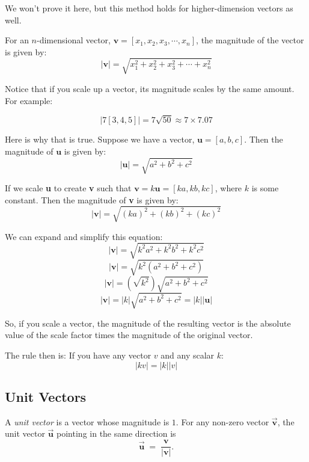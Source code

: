 We won't prove it here, but this method holds for higher-dimension vectors as well. 

\begin{mdframed}[style = important, frametitle = {Magnitude of Vectors}]
For an $n$-dimensional vector, $\textbf{v} = \left[ x_1, x_2, x_3, \cdots, x_n 
\right]$, the magnitude of the vector is given by:
$$\left| \textbf{v} \right| = \sqrt{x_1^2 + x_2^2 + x_3^2 + \cdots + x_n^2}$$
\end{mdframed}

Notice that if you scale up a vector, its magnitude scales by the same amount. 
For example:

\begin{equation*}
|7[3,4,5]| = 7 \sqrt{50} \approx 7 \times 7.07    
\end{equation*}

Here is why that is true. Suppose we have a vector, $\textbf{u} = \left[a, b, 
c \right]$. Then the magnitude of $\textbf{u}$ is given by:
$$\left| \textbf{u} \right| = \sqrt{a^2 + b^2 + c^2}$$

If we scale \textbf{u} to create \textbf{v} such that $\textbf{v} = k 
\textbf{u} = \left[ ka, kb, kc \right]$, where $k$ is some constant. Then the 
magnitude of \textbf{v} is given by:
$$\left| \textbf{v} \right| = \sqrt{\left( ka \right)^2 + \left( kb \right)^2 
+ \left( kc \right)^2}$$

We can expand and simplify this equation:
$$\left| \textbf{v} \right| = \sqrt{k^2 a^2 + k^2 b^2 + k^2 c^2}$$
$$\left| \textbf{v} \right| = \sqrt{k^2 \left( a^2 + b^2 + c^2 \right)}$$
$$\left| \textbf{v} \right| = \left( \sqrt{k^2} \right) \sqrt{a^2 + b^2 + 
c^2}$$
$$\left| \textbf{v} \right| = \left| k \right| \sqrt{a^2 + b^2 + c^2} = 
\left| k \right| \left| \textbf{u} \right|$$

So, if you scale a vector, the magnitude of the resulting vector is the absolute value of the scale factor times the magnitude of the original vector. 

The rule then is: If you have any vector $v$ and any scalar $k$:
\begin{equation*}
    |k v| = |k| |v|
\end{equation*}

\subsection{Unit Vectors}

A \emph{unit vector} is a vector whose magnitude is \(1\).
For any non-zero vector \(\vec{\mathbf v}\), the unit vector \(\vec{\mathbf{u}}\) pointing in the
same direction is
\[
\vec{\mathbf u}\;=\;\frac{\mathbf v}{\lvert \mathbf v\rvert}.
\]

